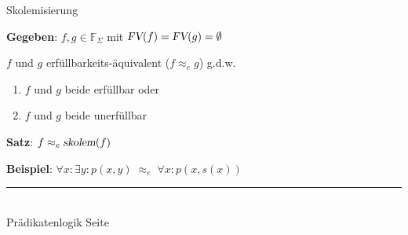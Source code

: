 \documentclass{slides}
\newcommand{\myrule}{\rule{20cm}{1mm}\\ }
\newcommand{\FV}{\textsl{FV}}
\newcounter{mypage}
\begin{document}
\begin{slide}{}
\normalsize
\begin{center}
Skolemisierung
\end{center}
\vspace{0.5cm}

\textbf{Gegeben}: $f,g \in \mathbb{F}_\Sigma$ \quad mit $\FV(f) = \FV(g) = \emptyset$

$f$ und $g$ erf\"{u}llbarkeits-\"{a}quivalent ($f \approx_e g$) \quad g.d.w.
\begin{enumerate}
\item $f$ und $g$ beide erf\"{u}llbar oder
\item $f$ und $g$ beide unerf\"{u}llbar
\end{enumerate}

\textbf{Satz}: $f \approx_e \textsl{skolem}(f)$

\textbf{Beispiel}: $\forall x: \exists y: p(x,y) \;\approx_e\; \forall x: p(x,s(x))$

\vspace*{\fill}
\tiny \addtocounter{mypage}{1}
\myrule
Pr\"{a}dikatenlogik   \hspace*{\fill} Seite 
\end{slide}


\end{document}
